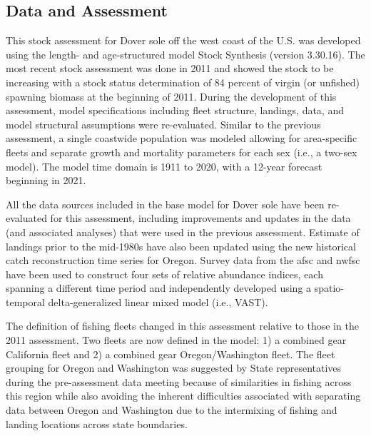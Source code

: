 \documentclass[11pt,
  english,
  a4paper,
]{article}
\begin{document}
\tagmcend\tagstructend


\hypertarget{data-and-assessment}{%
\subsection*{Data and Assessment}\label{data-and-assessment}}

\leavevmode\tagmcend\tagstructend


This stock assessment for Dover sole off the west coast of the U.S. was developed using the length- and age-structured model Stock Synthesis (version 3.30.16). The most recent stock assessment was done in 2011 and showed the stock to be increasing with a stock status determination of 84 percent of virgin (or unfished) spawning biomass at the beginning of 2011. During the development of this assessment, model specifications including fleet structure, landings, data, and model structural assumptions were re-evaluated. Similar to the previous assessment, a single coastwide population was modeled allowing for area-specific fleets and separate growth and mortality parameters for each sex (i.e., a two-sex model). The model time domain is 1911 to 2020, with a 12-year forecast beginning in 2021.

\leavevmode\tagmcend\tagstructend\par


All the data sources included in the base model for Dover sole have been re-evaluated for this assessment, including improvements and updates in the data (and associated analyses) that were used in the previous assessment. Estimate of landings prior to the mid-1980s have also been updated using the new historical catch reconstruction time series for Oregon. Survey data from the \gls{afsc} and \gls{nwfsc} have been used to construct four sets of relative abundance indices, each spanning a different time period and independently developed using a spatio-temporal delta-generalized linear mixed model (i.e., VAST).

\leavevmode\tagmcend\tagstructend\par


The definition of fishing fleets changed in this assessment relative to those in the 2011 assessment. Two fleets are now defined in the model: 1) a combined gear California fleet and 2) a combined gear Oregon/Washington fleet. The fleet grouping for Oregon and Washington was suggested by State representatives during the pre-assessment data meeting because of similarities in fishing across this region while also avoiding the inherent difficulties associated with separating data between Oregon and Washington due to the intermixing of fishing and landing locations across state boundaries.
\end{document}
